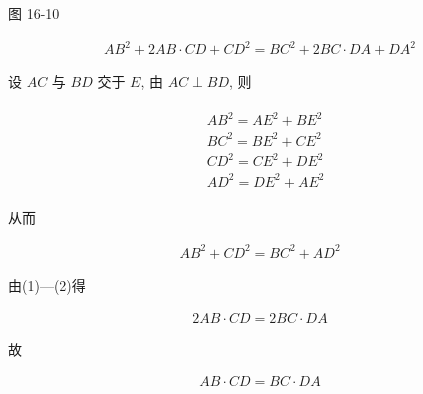 \documentclass[10pt]{article}
\begin{document}
图 16-10

\begin{align*}
A B^{2}+2 A B \cdot C D+C D^{2}=B C^{2}+2 B C \cdot D A+D A^{2} \tag{1}
\end{align*}

设 $A C$ 与 $B D$ 交于 $E$, 由 $A C \perp B D$, 则

\begin{align*}
\begin{aligned}
& A B^{2}=A E^{2}+B E^{2} \\
& B C^{2}=B E^{2}+C E^{2} \\
& C D^{2}=C E^{2}+D E^{2} \\
& A D^{2}=D E^{2}+A E^{2}
\end{aligned}
\end{align*}

从而

\begin{align*}
A B^{2}+C D^{2}=B C^{2}+A D^{2} \tag{2}
\end{align*}

由(1)—(2)得

\begin{align*}
2 A B \cdot C D=2 B C \cdot D A
\end{align*}

故

\begin{align*}
A B \cdot C D=B C \cdot D A
\end{align*}
\end{document}

